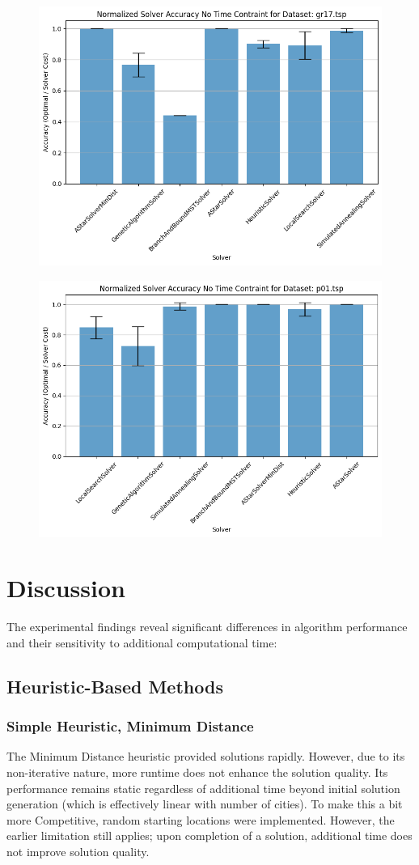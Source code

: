 \documentclass[11pt]{article}
\begin{document}
	\begin{figure}[H]
		\centering
		\includegraphics[width=0.7\linewidth]{figures/accuracy_bar_time0_gr17.tsp}
		\caption{}
		\label{fig:accuracybartime0gr17}
	\end{figure}
	\begin{figure}[H]
		\centering
		\includegraphics[width=0.7\linewidth]{figures/accuracy_bar_time0_p01.tsp}
		\caption{}
		\label{fig:accuracybartime0p01}
	\end{figure}
	
	
	\section{Discussion}
	The experimental findings reveal significant differences in algorithm performance and their sensitivity to additional computational time:
	
	\subsection{Heuristic-Based Methods}	
	\subsubsection{Simple Heuristic, Minimum Distance}
	The Minimum Distance heuristic provided solutions rapidly. However, due to its non-iterative nature, more runtime does not enhance the solution quality. Its performance remains static regardless of additional time beyond initial solution generation (which is effectively linear with number of cities). To make this a bit more Competitive, random starting locations were implemented. However, the earlier limitation still applies; upon completion of a solution, additional time does not improve solution quality.
	
\end{document}
